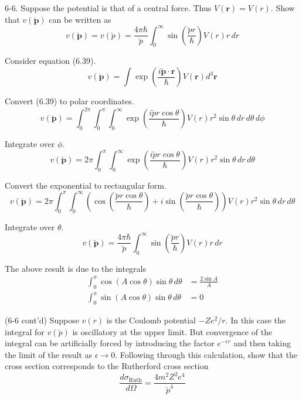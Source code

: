 \documentclass[12pt]{article}
\begin{document}
6-6.
Suppose the potential is that of a central force.
Thus $V(\mathbf r)=V(r)$.
Show that $v(\breve{\mathbf p})$ can be written as
\begin{equation*}
v(\breve{\mathbf p})=v(\breve p)=\frac{4\pi\hbar}{\breve p}
\int_0^\infty\sin\left(\frac{\breve pr}{\hbar}\right)V(r)r\,dr
\tag{6.45}
\end{equation*}

Consider equation (6.39).
\begin{equation*}
v(\breve{\mathbf p})=\int\exp\left(\frac{i\breve{\mathbf p}\cdot\mathbf r}{\hbar}\right)
V(\mathbf r)d^3\mathbf r
\tag{6.39}
\end{equation*}

Convert (6.39) to polar coordinates.
\begin{equation*}
v(\breve{\mathbf p})=\int_0^{2\pi}\int_0^\pi\int_0^\infty
\exp\left(\frac{i\breve pr\cos\theta}{\hbar}\right)
V(r)r^2\sin\theta\,dr\,d\theta\,d\phi
\end{equation*}

Integrate over $\phi$.
\begin{equation*}
v(\breve{\mathbf p})=2\pi\int_0^\pi\int_0^\infty
\exp\left(\frac{i\breve pr\cos\theta}{\hbar}\right)
V(r)r^2\sin\theta\,dr\,d\theta
\end{equation*}

Convert the exponential to rectangular form.
\begin{equation*}
v(\breve{\mathbf p})=2\pi\int_0^\pi\int_0^\infty
\left(\cos\left(\frac{\breve pr\cos\theta}{\hbar}\right)
+i\sin\left(\frac{\breve pr\cos\theta}{\hbar}\right)\right)
V(r)r^2\sin\theta\,dr\,d\theta
\end{equation*}

Integrate over $\theta$.
\begin{equation*}
v(\breve{\mathbf p})=\frac{4\pi\hbar}{\breve p}\int_0^\infty
\sin\left(\frac{\breve pr}{\hbar}\right)
V(r)r\,dr
\end{equation*}

The above result is due to the integrals
\begin{align*}
\int_0^\pi\cos(A\cos\theta)\sin\theta\,d\theta&=\frac{2\sin A}{A}
\\
\int_0^\pi\sin(A\cos\theta)\sin\theta\,d\theta&=0
\end{align*}

(6-6 cont'd)
Suppose $v(r)$ is the Coulomb potential $-Ze^2/r$.
In this case the integral for $v(\breve p)$ is oscillatory at the upper limit.
But convergence of the integral can be artificially forced by
introducing the factor $e^{-\epsilon r}$ and then taking the limit
of the result as $\epsilon\rightarrow0$.
Following through this calculation,
show that the cross section corresponds to the Rutherford cross section
\begin{equation*}
\frac{d\sigma_\text{Ruth}}{d\Omega}
=\frac{4m^2Z^2e^4}{\breve p^4}
\tag{6.46}
\end{equation*}
\end{document}
